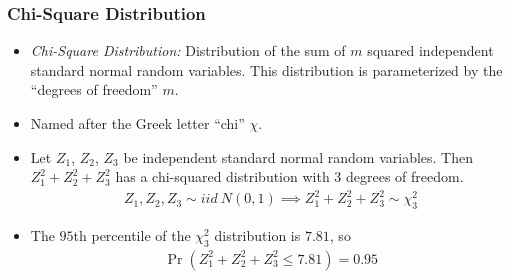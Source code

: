 

\begin{frame}
\frametitle{Chi-Square Distribution}
\begin{itemize}
\item \emph{Chi-Square Distribution:} Distribution of the sum of $m$ squared independent standard normal random variables. This distribution is parameterized by the ``degrees of freedom'' $m$.
\item Named after the Greek letter ``chi'' $\chi$.
\item Let $Z_1$, $Z_2$, $Z_3$ be independent standard normal random variables. Then $Z_1^2+Z_2^2+Z_3^2$ has a chi-squared distribution with 3 degrees of freedom. 
\begin{align*}
Z_1, Z_2, Z_3 \sim iid ~ N(0,1)
\implies 
Z_1^2 + Z_2^2 + Z_3^2 \sim \chi^2_3
\end{align*}
\item The $95$th percentile of the $\chi^2_3$ distribution is $7.81$, so 
\begin{align*}
\Pr(Z_1^2 + Z_2^2 + Z_3^2 \leq 7.81) = 0.95
\end{align*}
\end{itemize}
\end{frame}

